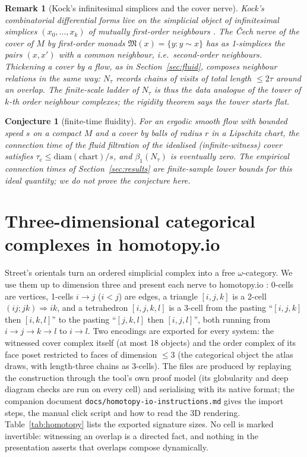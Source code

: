\documentclass[11pt]{article}
\newtheorem{remark}[definition]{Remark}
\newtheorem{conjecture}[definition]{Conjecture}
\begin{document}
\begin{remark}[Kock's infinitesimal simplices and the cover nerve]
Kock's combinatorial differential forms live on the simplicial object of infinitesimal simplices $(x_0,\dots,x_k)$ of mutually first-order neighbours \cite{kock2010}. The \v{C}ech nerve of the cover of $M$ by first-order monads $\mathfrak{M}(x)=\{y: y\sim x\}$ has as 1-simplices the pairs $(x,x')$ with a common neighbour, i.e.\ \emph{second}-order neighbours. Thickening a cover by a flow, as in Section~\ref{sec:fluid}, composes neighbour relations in the same way: $N_\tau$ records chains of visits of total length $\le2\tau$ around an overlap. The finite-scale ladder of $N_\tau$ is thus the data analogue of the tower of $k$-th order neighbour complexes; the rigidity theorem says the tower starts flat.
\end{remark}

\begin{conjecture}[finite-time fluidity]
For an ergodic smooth flow with bounded speed $s$ on a compact $M$ and a cover by balls of radius $r$ in a Lipschitz chart, the connection time of the fluid filtration of the idealised (infinite-witness) cover satisfies $\tau_{\mathrm{c}}\le \mathrm{diam}(\text{chart})/s$, and $\beta_1(N_\tau)$ is eventually zero. The empirical connection times of Section~\ref{sec:results} are finite-sample lower bounds for this ideal quantity; we do not prove the conjecture here.
\end{conjecture}

\section{Three-dimensional categorical complexes in homotopy.io}\label{sec:homotopy}
Street's orientals turn an ordered simplicial complex into a free $\omega$-category. We use them up to dimension three and present each nerve to homotopy.io \cite{homotopyio}: 0-cells are vertices, 1-cells $i\to j$ ($i<j$) are edges, a triangle $[i,j,k]$ is a 2-cell $(ij;jk)\Rightarrow ik$, and a tetrahedron $[i,j,k,l]$ is a 3-cell from the pasting ``$[i,j,k]$ then $[i,k,l]$'' to the pasting ``$[j,k,l]$ then $[i,j,l]$'', both running from $i\to j\to k\to l$ to $i\to l$. Two encodings are exported for every system: the witnessed cover complex itself (at most 18 objects) and the order complex of its face poset restricted to faces of dimension $\le3$ (the categorical object the atlas draws, with length-three chains as 3-cells). The files are produced by replaying the construction through the tool's own proof model (its globularity and deep diagram checks are run on every cell) and serialising with its native format; the companion document \texttt{docs/homotopy-io-instructions.md} gives the import steps, the manual click script and how to read the 3D rendering. Table~\ref{tab:homotopy} lists the exported signature sizes. No cell is marked invertible: witnessing an overlap is a directed fact, and nothing in the presentation asserts that overlaps compose dynamically.
\end{document}
